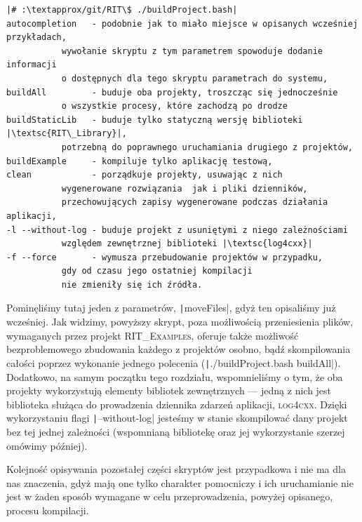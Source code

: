 \begin{verbatim}
|# :\textapprox/git/RIT\$ ./buildProject.bash|
autocompletion   - podobnie jak to miało miejsce w opisanych wcześniej przykładach, 
		   wywołanie skryptu z tym parametrem spowoduje dodanie informacji 
		   o dostępnych dla tego skryptu parametrach do systemu,
buildAll         - buduje oba projekty, troszcząc się jednocześnie 
		   o wszystkie procesy, które zachodzą po drodze
buildStaticLib   - buduje tylko statyczną wersję biblioteki |\textsc{RIT\_Library}|, 
		   potrzebną do poprawnego uruchamiania drugiego z projektów,
buildExample     - kompiluje tylko aplikację testową,
clean            - porządkuje projekty, usuwając z nich 
		   wygenerowane rozwiązania  jak i pliki dzienników, 
		   przechowujących zapisy wygenerowane podczas działania aplikacji,
-l --without-log - buduje projekt z usuniętymi z niego zależnościami
		   względem zewnętrznej biblioteki |\textsc{log4cxx}|
-f --force       - wymusza przebudowanie projektów w przypadku, 
		   gdy od czasu jego ostatniej kompilacji 
		   nie zmieniły się ich źródła.
\end{verbatim}

Pominęliśmy tutaj jeden z parametrów, \texttt|moveFiles|, gdyż ten opisaliśmy już wcześniej. Jak widzimy, powyższy skrypt, poza możliwością przeniesienia plików, wymaganych przez projekt \textsc{RIT\_Examples}, oferuje także możliwość bezproblemowego zbudowania każdego z projektów osobno, bądź skompilowania całości poprzez wykonanie jednego polecenia (\texttt|./buildProject.bash buildAll|). Dodatkowo, na samym początku tego rozdziału, wspomnieliśmy o tym, że oba projekty wykorzystują elementy bibliotek zewnętrznych --- jedną z nich jest biblioteka służąca do prowadzenia dziennika zdarzeń aplikacji, \textsc{log4cxx}. Dzięki wykorzystaniu flagi \texttt|--without-log| jesteśmy w stanie skompilować dany projekt bez tej jednej zależności (wspomnianą bibliotekę oraz jej wykorzystanie szerzej omówimy później).

Kolejność opisywania pozostałej części skryptów jest przypadkowa i nie ma dla nas znaczenia, gdyż mają one tylko charakter pomocniczy i ich uruchamianie nie jest w żaden sposób wymagane w celu przeprowadzenia, powyżej opisanego, procesu kompilacji.


